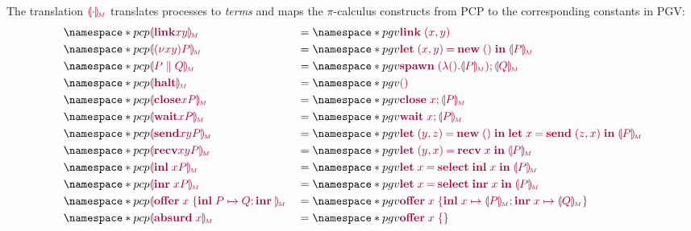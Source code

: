 The translation $\tm{\cpgvM{\cdot}}$ translates processes to \emph{terms} and maps the $\pi$-calculus constructs from PCP to the corresponding constants in PGV:
\begin{align*}
  &\pcp{\tm{\cpgvM{\link{x}{y}}}}
  &&= \pgv{\tm{\link\;{\pair{x}{y}}}} \\
  &\pcp{\tm{\cpgvM{\res{x}{y}{P}}}}
  &&= \pgv{\tm{\letpair{x}{y}{\new\;\unit}{\cpgvM{P}}}} \\
  &\pcp{\tm{\cpgvM{\ppar{P}{Q}}}}
  &&= \pgv{\tm{\andthen{\spawn\;{(\lambda\unit.\cpgvM{P})}}{\cpgvM{Q}}}} \\
  &\pcp{\tm{\cpgvM{\halt}}}
  &&= \pgv{\tm{\unit}} \\
  &\pcp{\tm{\cpgvM{\close{x}{P}}}}
  &&= \pgv{\tm{\andthen{\close\;{x}}{\cpgvM{P}}}} \\
  &\pcp{\tm{\cpgvM{\wait{x}{P}}}}
  &&= \pgv{\tm{\andthen{\wait\;{x}}{\cpgvM{P}}}} \\
  &\pcp{\tm{\cpgvM{\send{x}{y}{P}}}}
  &&= \pgv{\tm{\letpair{y}{z}{\new\;\unit}{\letbind{x}{\send\;{\pair{z}{x}}}{\cpgvM{P}}}}} \\
  &\pcp{\tm{\cpgvM{\recv{x}{y}{P}}}}
  &&= \pgv{\tm{\letpair{y}{x}{\recv\;{x}}{\cpgvM{P}}}} \\
  &\pcp{\tm{\cpgvM{\inl{x}{P}}}}
  &&= \pgv{\tm{\letbind{x}{\select{\labinl}\;{x}}{\cpgvM{P}}}} \\
  &\pcp{\tm{\cpgvM{\inr{x}{P}}}}
  &&= \pgv{\tm{\letbind{x}{\select{\labinr}\;{x}}{\cpgvM{P}}}} \\
  &\pcp{\tm{\cpgvM{\offer{x}{P}{Q}}}}
  &&= \pgv{\tm{\offer{x}{x}{\cpgvM{P}}{x}{\cpgvM{Q}}}} \\
  &\pcp{\tm{\cpgvM{\absurd{x}}}}
  &&= \pgv{\tm{\offeremp{x}}}
\end{align*}

